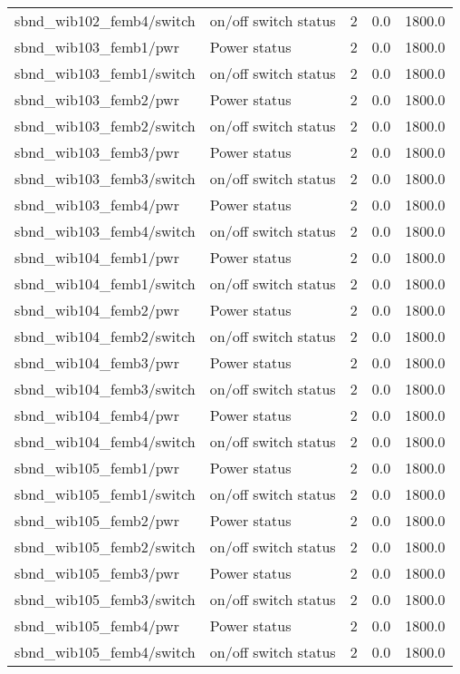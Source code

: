 \begin{center}
\begin{longtable}{l | l l l l }
sbnd\_wib102\_femb4/switch & on/off switch status & 2 & 0.0 & 1800.0\\ 
sbnd\_wib103\_femb1/pwr & Power status & 2 & 0.0 & 1800.0\\ 
sbnd\_wib103\_femb1/switch & on/off switch status & 2 & 0.0 & 1800.0\\ 
sbnd\_wib103\_femb2/pwr & Power status & 2 & 0.0 & 1800.0\\ 
sbnd\_wib103\_femb2/switch & on/off switch status & 2 & 0.0 & 1800.0\\ 
sbnd\_wib103\_femb3/pwr & Power status & 2 & 0.0 & 1800.0\\ 
sbnd\_wib103\_femb3/switch & on/off switch status & 2 & 0.0 & 1800.0\\ 
sbnd\_wib103\_femb4/pwr & Power status & 2 & 0.0 & 1800.0\\ 
sbnd\_wib103\_femb4/switch & on/off switch status & 2 & 0.0 & 1800.0\\ 
sbnd\_wib104\_femb1/pwr & Power status & 2 & 0.0 & 1800.0\\ 
sbnd\_wib104\_femb1/switch & on/off switch status & 2 & 0.0 & 1800.0\\ 
sbnd\_wib104\_femb2/pwr & Power status & 2 & 0.0 & 1800.0\\ 
sbnd\_wib104\_femb2/switch & on/off switch status & 2 & 0.0 & 1800.0\\ 
sbnd\_wib104\_femb3/pwr & Power status & 2 & 0.0 & 1800.0\\ 
sbnd\_wib104\_femb3/switch & on/off switch status & 2 & 0.0 & 1800.0\\ 
sbnd\_wib104\_femb4/pwr & Power status & 2 & 0.0 & 1800.0\\ 
sbnd\_wib104\_femb4/switch & on/off switch status & 2 & 0.0 & 1800.0\\ 
sbnd\_wib105\_femb1/pwr & Power status & 2 & 0.0 & 1800.0\\ 
sbnd\_wib105\_femb1/switch & on/off switch status & 2 & 0.0 & 1800.0\\ 
sbnd\_wib105\_femb2/pwr & Power status & 2 & 0.0 & 1800.0\\ 
sbnd\_wib105\_femb2/switch & on/off switch status & 2 & 0.0 & 1800.0\\ 
sbnd\_wib105\_femb3/pwr & Power status & 2 & 0.0 & 1800.0\\ 
sbnd\_wib105\_femb3/switch & on/off switch status & 2 & 0.0 & 1800.0\\ 
sbnd\_wib105\_femb4/pwr & Power status & 2 & 0.0 & 1800.0\\ 
sbnd\_wib105\_femb4/switch & on/off switch status & 2 & 0.0 & 1800.0\\ 

\end{longtable}
\end{center}
